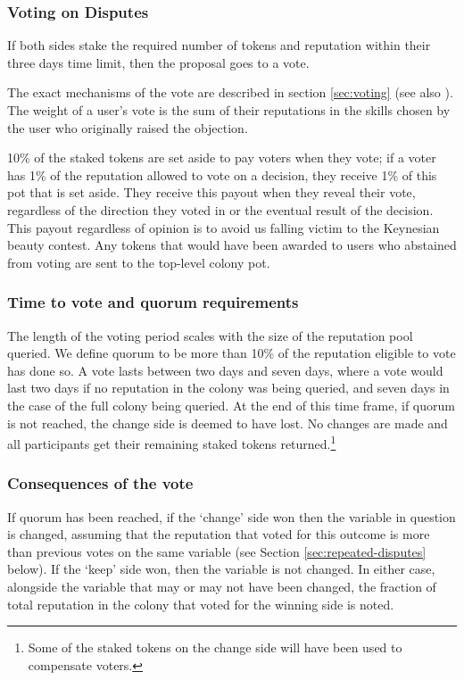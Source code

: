 \subsubsection{Voting on Disputes}
If both sides stake the required number of tokens and reputation within their three days time limit, then the proposal goes to a vote.

The exact mechanisms of the vote are described in section \ref{sec:voting} (see also \cite{ColonyVoting}). The weight of a user's vote is the sum of their reputations in the skills chosen by the user who originally raised the objection.

10\% of the staked tokens are set aside to pay voters when they vote; if a voter has 1\% of the reputation allowed to vote on a decision, they receive 1\% of this pot that is set aside. They receive this payout when they reveal their vote, regardless of the direction they voted in or the eventual result of the decision. This payout regardless of opinion is to avoid us falling victim to the Keynesian beauty contest\cite{KeynesianBeauty}. Any tokens that would have been awarded to users who abstained from voting are sent to the top-level colony pot.


\subsubsection{Time to vote and quorum requirements}
The length of the voting period scales with the size of the reputation pool queried. We define quorum to be more than 10\% of the reputation eligible to vote has done so. A vote lasts between two days and seven days, where a vote would last two days if no reputation in the colony was being queried, and seven days in the case of the full colony being queried. At the end of this time frame, if quorum is not reached, the change side is deemed to have lost. No changes are made and all participants get their remaining staked tokens returned.\footnote{Some of the staked tokens on the change side will have been used to compensate voters.}

\subsubsection{Consequences of the vote}
If quorum has been reached, if the `change' side won then the variable in question is changed, assuming that the reputation that voted for this outcome is more than previous votes on the same variable (see Section \ref{sec:repeated-disputes} below). If the `keep' side won, then the variable is not changed. In either case, alongside the variable that may or may not have been changed, the fraction of total reputation in the colony that voted for the winning side is noted. 


